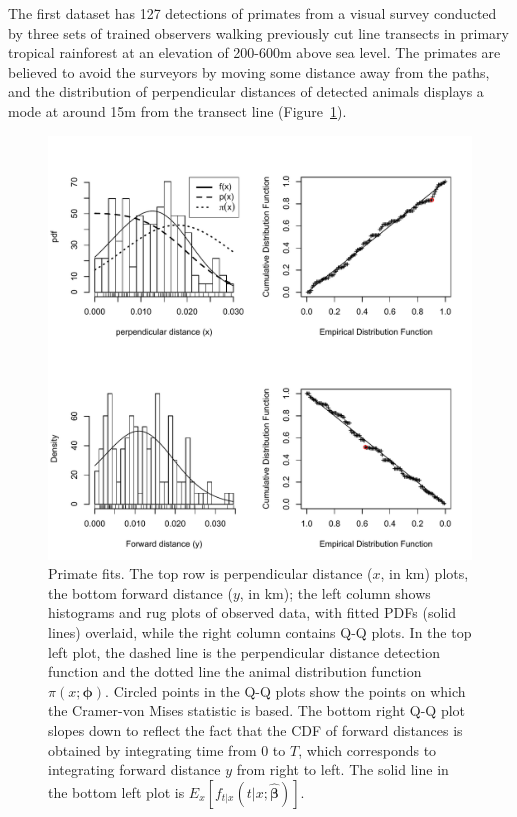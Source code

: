 \documentclass[useAMS,usenatbib,referee]{biom}
\begin{document}
The first dataset has 127 detections of primates from a visual survey conducted by three sets of trained observers walking previously cut line transects in primary tropical rainforest at an elevation of 200-600m above sea level. The primates are believed to avoid the surveyors by moving some distance away from the paths, and the distribution of perpendicular distances of detected animals displays a mode at around 15m from the transect line (Figure~\ref{fig:primate.fits}).

\begin{figure}
\caption{Primate fits. The top row is perpendicular distance ($x$, in km) plots, the bottom forward distance ($y$, in km); the left column shows histograms and rug plots of observed data, with fitted PDFs (solid lines) overlaid, while the right column contains Q-Q plots. In the top left plot, the dashed line is the perpendicular distance detection function and the dotted line the animal distribution function $\pi(x;\boldsymbol{\phi})$. Circled points in the Q-Q plots show the points on which the Cramer-von Mises statistic is based. The bottom right Q-Q plot slopes down to reflect the fact that the CDF of forward distances is obtained by integrating time from 0 to $T$, which corresponds to integrating forward distance $y$ from right to left. The solid line in the bottom left plot is $E_x[f_{t|x}(t|x;\hat{\boldsymbol{\beta}})]$.\label{fig:primate.fits}}
\includegraphics[scale=0.6]{PrimateFits.pdf}
\end{figure}
\end{document}
